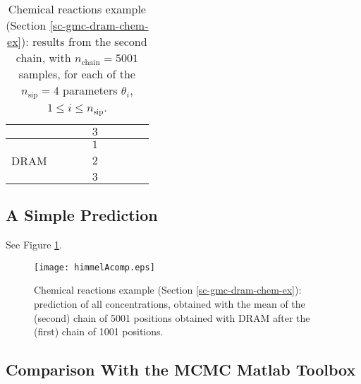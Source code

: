 \begin{table}[h!]
\begin{center}
\begin{tabular}{|c|c|c|c|c|c|c|c|c|}
\cline{5-9}
       &          &                        &                        & $3$ &                          &                                &                        &                               \\
\hline
\hline
       &          &                        &                        & $1$ &                          &                                &                        &                               \\
\cline{5-9}
DRAM   &          &                        &                        & $2$ &                          &                                &                        &                               \\
\cline{5-9}
       &          &                        &                        & $3$ &                          &                                &                        &                               \\
\hline
\end{tabular}
\caption{Chemical reactions example (Section \ref{sc-gmc-dram-chem-ex}):
results from the second chain, with $n_{\text{chain}}=5001$ samples,
for each of the $n_{\text{sip}}=4$ parameters $\theta_i$, $1\leqslant i\leqslant n_{\text{sip}}$.
}
\label{tab-dram-chem-ex-results-2}
\end{center}
\end{table}

\clearpage
\subsection{A Simple Prediction}

See Figure \ref{fig-dram-chem-ex-prediction}.

\begin{figure}[h!]
\begin{center}
\texttt{[image: himmelAcomp.eps]}
\end{center}
\caption{Chemical reactions example (Section \ref{sc-gmc-dram-chem-ex}):
prediction of all concentrations, obtained with the mean of the (second) chain of 5001 positions obtained with DRAM
after the (first) chain of 1001 positions.
}
\label{fig-dram-chem-ex-prediction}
\end{figure}

\clearpage
\subsection{Comparison With the MCMC Matlab Toolbox}

